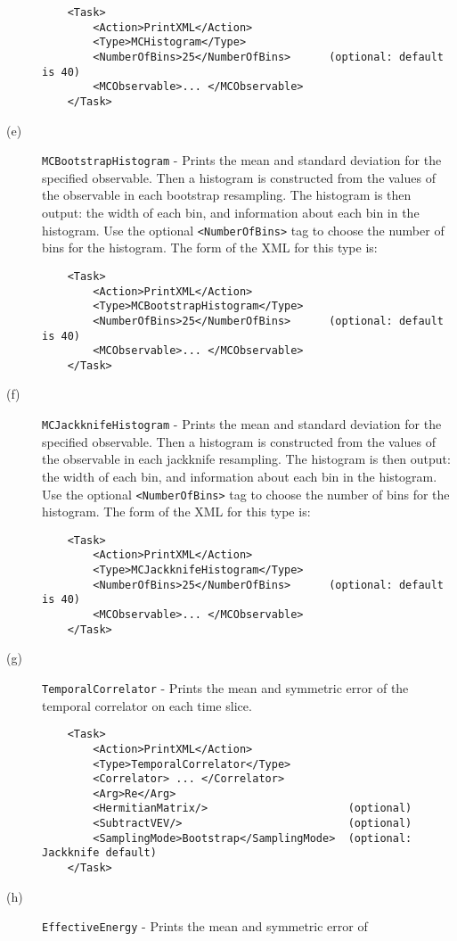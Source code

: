 \documentclass[12pt]{article}
\newcommand{\vb}{\texttt}
\begin{document}
\begin{description}
\begin{verbatim}
    <Task>
        <Action>PrintXML</Action>
        <Type>MCHistogram</Type>
        <NumberOfBins>25</NumberOfBins>      (optional: default is 40)
        <MCObservable>... </MCObservable>
    </Task>
\end{verbatim}
\item[(e)] \vb{MCBootstrapHistogram} - Prints the mean and standard
  deviation for the specified observable.
  Then a histogram is constructed from the values of the observable in each bootstrap resampling.
  The histogram is then output: the width of each bin, and information about each bin in the histogram.
  Use the optional \vb{<NumberOfBins>} tag to choose the number of bins for the histogram.
  The form of the XML for this type is:
\begin{verbatim}
    <Task>
        <Action>PrintXML</Action>
        <Type>MCBootstrapHistogram</Type>
        <NumberOfBins>25</NumberOfBins>      (optional: default is 40)
        <MCObservable>... </MCObservable>
    </Task>
\end{verbatim}
\item[(f)] \vb{MCJackknifeHistogram} - Prints the mean and standard
  deviation for the specified observable.
  Then a histogram is constructed from the values of the observable in each jackknife resampling.
  The histogram is then output: the width of each bin, and information about each bin in the histogram.
  Use the optional \vb{<NumberOfBins>} tag to choose the number of bins for the histogram.
  The form of the XML for this type is:
\begin{verbatim}
    <Task>
        <Action>PrintXML</Action>
        <Type>MCJackknifeHistogram</Type>
        <NumberOfBins>25</NumberOfBins>      (optional: default is 40)
        <MCObservable>... </MCObservable>
    </Task>
\end{verbatim}
\item[(g)] \vb{TemporalCorrelator} - Prints the mean and symmetric error
of the temporal correlator on each time slice.
\begin{verbatim}
    <Task>
        <Action>PrintXML</Action>
        <Type>TemporalCorrelator</Type>
        <Correlator> ... </Correlator>
        <Arg>Re</Arg>
        <HermitianMatrix/>                      (optional)
        <SubtractVEV/>                          (optional)
        <SamplingMode>Bootstrap</SamplingMode>  (optional: Jackknife default)
    </Task>
\end{verbatim}
\item[(h)] \vb{EffectiveEnergy} - Prints the mean and symmetric error of

\end{description}
\end{document}
